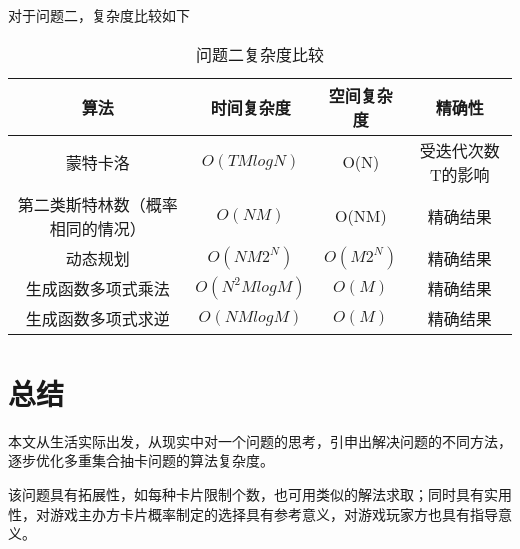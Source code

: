 \documentclass[master]{thesis-uestc}
\begin{document}
    对于问题二，复杂度比较如下


\begin{table}[h]
    \caption{问题二复杂度比较}
    \begin{tabular}{|c|c|c|c|}
    \hline
    算法 & 时间复杂度 & 空间复杂度 & 精确性 \\
    \hline
    蒙特卡洛 & $O(TMlogN)$ & O(N) & 受迭代次数T的影响\\
    \hline
    第二类斯特林数（概率相同的情况） & $O(NM)$ & O(NM) & 精确结果 \\
    \hline
    动态规划 & $O(NM2^N)$ & $O(M2^N)$ & 精确结果 \\
    \hline
    生成函数多项式乘法 & $O(N^2MlogM)$ & $O(M)$ & 精确结果 \\
    \hline
    生成函数多项式求逆 & $O(NMlogM)$ & $O(M)$ & 精确结果 \\
    \hline
    \end{tabular}
    \label{tablea}
    \end{table}

\section{总结}

本文从生活实际出发，从现实中对一个问题的思考，引申出解决问题的不同方法，逐步优化多重集合抽卡问题的算法复杂度。

该问题具有拓展性，如每种卡片限制个数，也可用类似的解法求取；同时具有实用性，对游戏主办方卡片概率制定的选择具有参考意义，对游戏玩家方也具有指导意义。
\end{document}
